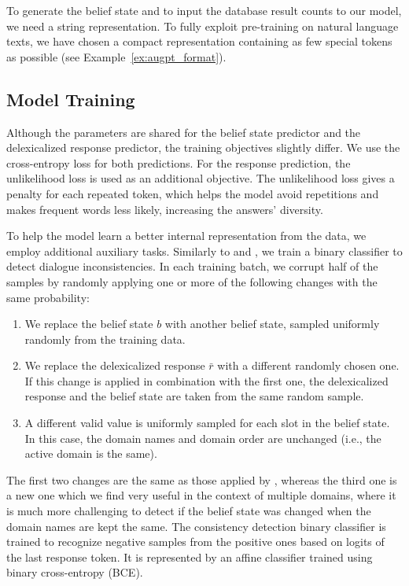 \documentclass[11pt,a4paper]{article}
\newcommand{\exampleref}[1]{Example~\ref{#1}}
\begin{document}
To generate the belief state and to input the database result counts to our model, we need a string representation. To fully exploit pre-training on natural language texts, we have chosen a compact representation containing as few special tokens as possible (see \exampleref{ex:augpt_format}).


\subsection{Model Training}
\label{sec:model-traning}
Although the parameters are shared for the belief state predictor and the delexicalized response predictor, the training objectives slightly differ. We use the cross-entropy loss for both predictions. For the response prediction, the unlikelihood loss \cite{welleck2019,li_dont_2020} is used as an additional objective. The unlikelihood loss gives a penalty for each repeated token, which helps the model avoid repetitions and makes frequent words less likely, increasing the answers' diversity.

To help the model learn a better internal representation from the data, we employ additional auxiliary tasks. Similarly to \citet{devlin2019} and \citet{peng2020}, we train a binary classifier to detect dialogue inconsistencies. In each training batch, we corrupt half of the samples by randomly applying one or more of the following changes with the same probability:
\begin{enumerate}
    \item We replace the belief state $b$ with another belief state, sampled uniformly randomly from the training data.
    \item We replace the delexicalized response $\bar{r}$ with a different randomly chosen one. If this change is applied in combination with the first one, the delexicalized response and the belief state are taken from the same random sample.
    \item A different valid value is uniformly sampled for each slot in the belief state. In this case, the domain names and domain order are unchanged (i.e., the active domain is the same).
\end{enumerate}
The first two changes are the same as those applied by \citet{peng2020}, whereas the third one is a new one which we find very useful in the context of multiple domains, where it is much more challenging to detect if the belief state was changed when the domain names are kept the same.
The consistency detection binary classifier is trained to recognize negative samples from the positive ones based on logits of the last response token. It is represented by an affine classifier trained using binary cross-entropy (BCE).
\end{document}
